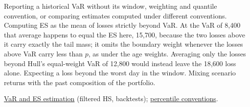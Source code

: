 \begin{qfmethod}
 Reporting a historical VaR without its window, weighting and quantile convention, or comparing estimates computed under different conventions. Computing ES as the mean of losses strictly beyond VaR. At the VaR of 8{,}400 that average happens to equal the ES here, 15{,}700, because the two losses above it carry exactly the tail mass; it omits the boundary weight whenever the losses above VaR carry less than $p$, as under the age weights. Averaging only the losses beyond Hull's equal-weight VaR of 12{,}800 would instead leave the 18{,}600 loss alone. Expecting a loss beyond the worst day in the window. Mixing scenario returns with the past composition of the portfolio.

 \hyperref[meth:var-es-estimation-methods]{VaR and ES estimation} (filtered HS, backtests); \hyperref[def:return-sample-statistics]{percentile conventions}.

\end{qfmethod}

